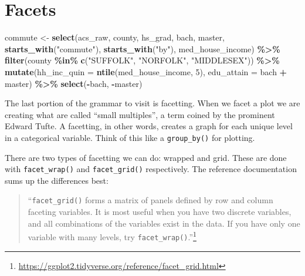 \documentclass[
]{book}
\newenvironment{Shaded}{\begin{snugshade}}{\end{snugshade}}
\newcommand{\DataTypeTok}[1]{\textcolor[rgb]{0.13,0.29,0.53}{#1}}
\newcommand{\DecValTok}[1]{\textcolor[rgb]{0.00,0.00,0.81}{#1}}
\newcommand{\KeywordTok}[1]{\textcolor[rgb]{0.13,0.29,0.53}{\textbf{#1}}}
\newcommand{\NormalTok}[1]{#1}
\newcommand{\OperatorTok}[1]{\textcolor[rgb]{0.81,0.36,0.00}{\textbf{#1}}}
\newcommand{\StringTok}[1]{\textcolor[rgb]{0.31,0.60,0.02}{#1}}
\begin{document}
\hypertarget{facets}{%
\section{Facets}\label{facets}}

\begin{Shaded}
\begin{Highlighting}[]
\NormalTok{commute \textless{}{-}}\StringTok{ }\KeywordTok{select}\NormalTok{(acs\_raw,}
\NormalTok{       county,}
\NormalTok{       hs\_grad, bach, master,}
       \KeywordTok{starts\_with}\NormalTok{(}\StringTok{"commute"}\NormalTok{),}
       \KeywordTok{starts\_with}\NormalTok{(}\StringTok{"by"}\NormalTok{),}
\NormalTok{       med\_house\_income) }\OperatorTok{\%\textgreater{}\%}\StringTok{ }
\StringTok{  }\KeywordTok{filter}\NormalTok{(county }\OperatorTok{\%in\%}\StringTok{ }\KeywordTok{c}\NormalTok{(}\StringTok{"SUFFOLK"}\NormalTok{, }\StringTok{"NORFOLK"}\NormalTok{, }\StringTok{"MIDDLESEX"}\NormalTok{)) }\OperatorTok{\%\textgreater{}\%}\StringTok{ }
\StringTok{  }\KeywordTok{mutate}\NormalTok{(}\DataTypeTok{hh\_inc\_quin =} \KeywordTok{ntile}\NormalTok{(med\_house\_income, }\DecValTok{5}\NormalTok{),}
         \DataTypeTok{edu\_attain =}\NormalTok{ bach }\OperatorTok{+}\StringTok{ }\NormalTok{master) }\OperatorTok{\%\textgreater{}\%}\StringTok{ }
\StringTok{  }\KeywordTok{select}\NormalTok{(}\OperatorTok{{-}}\NormalTok{bach, }\OperatorTok{{-}}\NormalTok{master)}
\end{Highlighting}
\end{Shaded}

The last portion of the grammar to visit is facetting. When we facet a plot we are creating what are called ``small multiples'', a term coined by the prominent Edward Tufte. A facetting, in other words, creates a graph for each unique level in a categorical variable. Think of this like a \texttt{group\_by()} for plotting.

There are two types of facetting we can do: wrapped and grid. These are done with \texttt{facet\_wrap()} and \texttt{facet\_grid()} respectively. The reference documentation sums up the differences best:

\begin{quote}
``\texttt{facet\_grid()} forms a matrix of panels defined by row and column faceting variables. It is most useful when you have two discrete variables, and all combinations of the variables exist in the data. If you have only one variable with many levels, try \texttt{facet\_wrap()}.''\footnote{\url{https://ggplot2.tidyverse.org/reference/facet_grid.html}}
\end{quote}
\end{document}
